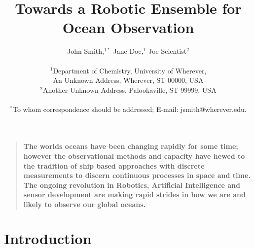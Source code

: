 \documentclass[12pt]{article}
\title{Towards a Robotic Ensemble for Ocean Observation}
\author
{John Smith,$^{1\ast}$ Jane Doe,$^{1}$ Joe Scientist$^{2}$\\
\\
\normalsize{$^{1}$Department of Chemistry, University of Wherever,}\\
\normalsize{An Unknown Address, Wherever, ST 00000, USA}\\
\normalsize{$^{2}$Another Unknown Address, Palookaville, ST 99999, USA}\\
\\
\normalsize{$^\ast$To whom correspondence should be addressed; E-mail:  jsmith@wherever.edu.}
}
\date{}
\newenvironment{sciabstract}{%
\begin{quote} \bf}
{\end{quote}}
\begin{document}
\baselineskip24pt


\maketitle 


\begin{sciabstract}
  The worlds oceans have been changing rapidly for some time; however
  the observational methods and capacity have hewed to the tradition
  of ship based approaches with discrete measurements to discern
  continuous processes in space and time.  The ongoing revolution in
  Robotics, Artificial Intelligence and sensor development are making
  rapid strides in how we are and likely to observe our global
  oceans. 
\end{sciabstract}



\section{Introduction}
\end{document}
